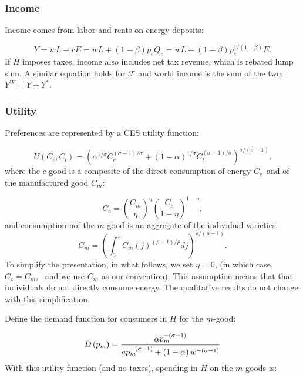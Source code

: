 \documentclass[notitlepage,12pt]{article}
\begin{document}
\subsubsection{Income}

Income comes from labor and rents on energy deposits:

\begin{equation*}
Y=wL+rE=wL+\left( 1-\beta \right) p_{e}Q_{e}=wL+\left( 1-\beta \right)
p_{e}^{1/\left( 1-\beta \right) }E.
\end{equation*}%
If $H$ imposes taxes, income also includes net tax revenue, which is rebated
lump sum. A similar equation holds for $\mathcal{F}$ and world income is the
sum of the two: $Y^{W}=Y+Y^{\ast }$.

\subsubsection{Utility}

Preferences are represented by a CES utility function:

\begin{equation}
U\left( C_{c},C_{l}\right) =\left( \alpha ^{1/\sigma }C_{c}^{\left( \sigma
-1\right) /\sigma }+\left( 1-\alpha \right) ^{1/\sigma }C_{l}^{\left( \sigma
-1\right) /\sigma }\right) ^{\sigma /\left( \sigma -1\right) }.
\label{utility}
\end{equation}%
where the $c$-good is a composite of the direct consumption of energy $C_{e%
\text{ }}$and of the manufactured good $C_{m}$:

\begin{equation*}
C_{c}=\left( \frac{C_{m}}{\eta }\right) ^{\eta }\left( \frac{C_{e}}{1-\eta }%
\right) ^{1-\eta },
\end{equation*}%
and consumption nof the $m$-good is an aggregate of the individual varieties:%
\begin{equation*}
C_{m}=\left( \int_{0}^{1}C_{m}(j)^{\left( \rho -1\right) /\rho }dj\right)
^{\rho /\left( \rho -1\right) }.
\end{equation*}%
To simplify the presentation, in what follows, we set $\eta =0$, (in which
case, $C_{c}=C_{m}$, \ and we use $C_{m}$ as our convention). This
assumption means that that individuals do not directly consume energy. The
qualitative results do not change with this simplification.

Define the demand function for consumers in $H$ for the $m$-good:

\begin{equation*}
D\left( p_{m}\right) =\frac{\alpha p_{m}^{-\left( \sigma -1\right) }}{%
ap_{m}^{-\left( \sigma -1\right) }+\left( 1-\alpha \right) w^{-\left( \sigma
-1\right) }}
\end{equation*}%
With this utility function (and no taxes), spending in $H$ on the $m$-goods
is:
\end{document}
